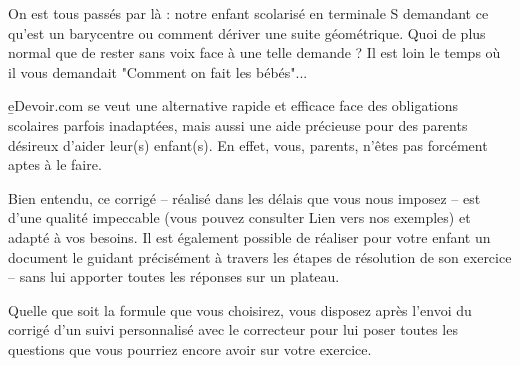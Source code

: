 On est tous passés par là : notre enfant scolarisé en terminale S demandant ce qu'est un barycentre ou comment dériver une suite géométrique. Quoi de plus normal que de rester sans voix face à une telle demande ? Il est loin le temps où il vous demandait "Comment on fait les bébés"...

\b{eDevoir.com} se veut une alternative rapide et efficace face des obligations scolaires parfois inadaptées, mais aussi une aide précieuse pour des parents désireux d'aider leur(s) enfant(s). En effet, vous, parents, n'êtes pas forcément aptes à le faire.

Bien entendu, ce corrigé -- réalisé dans les délais que vous nous imposez -- est d'une qualité impeccable (vous pouvez consulter Lien vers nos exemples) et adapté à vos besoins. Il est également possible de réaliser pour votre enfant un document le guidant précisément à travers les étapes de résolution de son exercice -- sans lui apporter toutes les réponses sur un plateau.

Quelle que soit la formule que vous choisirez, vous disposez après l'envoi du corrigé d'un suivi personnalisé avec le correcteur pour lui poser toutes les questions que vous pourriez encore avoir sur votre exercice.
